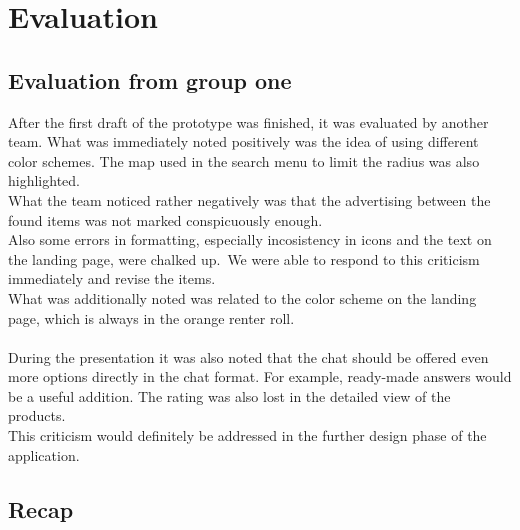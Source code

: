 \clearpage
\section{Evaluation}

\subsection{Evaluation from group one}
After the first draft of the prototype was finished, it was evaluated by another team.
What was immediately noted positively was the idea of using different color schemes.
The map used in the search menu to limit the radius was also highlighted. \\
What the team noticed rather negatively was that the advertising between the found items was not marked conspicuously enough. \\
Also some errors in formatting, especially incosistency in icons and the text on the landing page, were chalked up.\
We were able to respond to this criticism immediately and revise the items.\
\\
What was additionally noted was related to the color scheme on the landing page, which is always in the orange renter roll. \\
\\
During the presentation it was also noted that the chat should be offered even more options directly in the chat format. For example, ready-made answers would be a useful addition. The rating was also lost in the detailed view of the products. \\
This criticism would definitely be addressed in the further design phase of the application.


\subsection{Recap}

